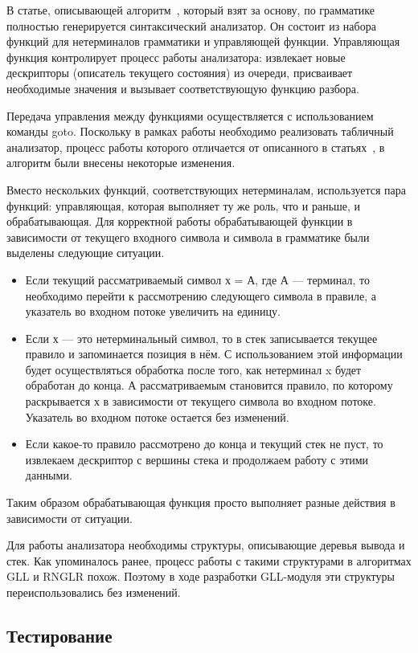 В статье, описывающей алгоритм~\cite{gll}, который взят за основу, по грамматике полностью генерируется синтаксический анализатор. Он состоит из набора функций для нетерминалов грамматики и управляющей функции. Управляющая функция контролирует процесс работы анализатора: извлекает новые дескрипторы (описатель текущего состояния) из очереди, присваивает необходимые значения и вызывает соответствующую функцию разбора.

Передача управления между функциями осуществляется с использованием команды goto. Поскольку в рамках работы необходимо реализовать табличный анализатор,  процесс работы которого отличается от описанного в статьях~\cite{imp}, в алгоритм были внесены некоторые изменения.

Вместо нескольких функций, соответствующих нетерминалам, используется пара функций: управляющая, которая выполняет ту же роль, что  и раньше,  и обрабатывающая. Для корректной работы обрабатывающей функции в зависимости от текущего входного символа и символа в грамматике были выделены следующие ситуации.

\begin{itemize}
\item Если текущий рассматриваемый символ х = А, где А --- терминал, то необходимо перейти к рассмотрению следующего символа в правиле, а указатель во входном потоке увеличить на единицу.
\item Если х --- это нетерминальный символ, то в стек записывается текущее правило и запоминается позиция в нём. С использованием этой информации будет осуществляться обработка после того, как нетерминал x будет обработан до конца. А рассматриваемым становится правило, по которому раскрывается х в зависимости от текущего символа во входном потоке. Указатель во входном потоке остается без изменений.
\item Если какое-то правило рассмотрено до конца и текущий стек не пуст, то извлекаем дескриптор с вершины стека и продолжаем работу с этими данными.
\end{itemize}

Таким образом обрабатывающая функция просто выполняет разные действия в зависимости от ситуации.

Для работы анализатора необходимы структуры, описывающие деревья вывода и стек. Как упоминалось ранее, процесс работы с такими структурами в алгоритмах GLL и RNGLR похож. Поэтому в ходе разработки GLL-модуля эти структуры переиспользовались без изменений. 

\subsection{Тестирование}

